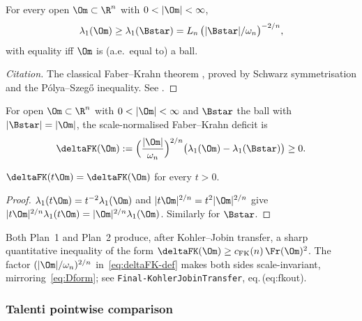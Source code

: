 \begin{theorem}\label{thm:FK}
For every open $\Om\subset\R^n$ with $0<|\Om|<\infty$,
\begin{equation}\label{eq:FK}
   \lambda_1(\Om)\ge\lambda_1(\Bstar)
   =L_n\,\bigl(|\Bstar|/\omega_n\bigr)^{-2/n},
\end{equation}
with equality iff $\Om$ is (a.e.\ equal to) a ball.
\end{theorem}

\begin{proof}[Citation]
The classical Faber--Krahn theorem \cite{Faber1923,Krahn1925}, proved
by Schwarz symmetrisation and the P\'olya--Szeg\H{o} inequality. See
\cite[Thm.~3.2.1]{HenrotBook}.
\end{proof}

\begin{definition}
\label{def:deltaFK}
For open $\Om\subset\R^n$ with $0<|\Om|<\infty$ and $\Bstar$ the ball
with $|\Bstar|=|\Om|$, the scale-normalised Faber--Krahn deficit is
\begin{equation}\label{eq:deltaFK-def}
   \deltaFK(\Om)
   :=\Bigl(\frac{|\Om|}{\omega_n}\Bigr)^{2/n}
     \bigl(\lambda_1(\Om)-\lambda_1(\Bstar)\bigr)\ge 0.
\end{equation}
\end{definition}

\begin{lemma}\label{lem:deltaFK-scale}
$\deltaFK(t\Om)=\deltaFK(\Om)$ for every $t>0$.
\end{lemma}

\begin{proof}
$\lambda_1(t\Om)=t^{-2}\lambda_1(\Om)$ and
$|t\Om|^{2/n}=t^2|\Om|^{2/n}$ give
$|t\Om|^{2/n}\lambda_1(t\Om)=|\Om|^{2/n}\lambda_1(\Om)$. Similarly for
$\Bstar$.
\end{proof}

\begin{remark}\label{rem:deltaFK-form}
Both Plan~1 and Plan~2 produce, after Kohler--Jobin transfer, a sharp
quantitative inequality of the form
$\deltaFK(\Om)\ge c_{\mathrm{FK}}(n)\,\Fr(\Om)^2$. The factor
$(|\Om|/\omega_n)^{2/n}$ in~\eqref{eq:deltaFK-def} makes both sides
scale-invariant, mirroring~\eqref{eq:Dform}; see
\texttt{Final-KohlerJobinTransfer}, eq.\,(eq:fkout).
\end{remark}

\subsubsection{Talenti pointwise comparison}\label{ssec:Talenti}

